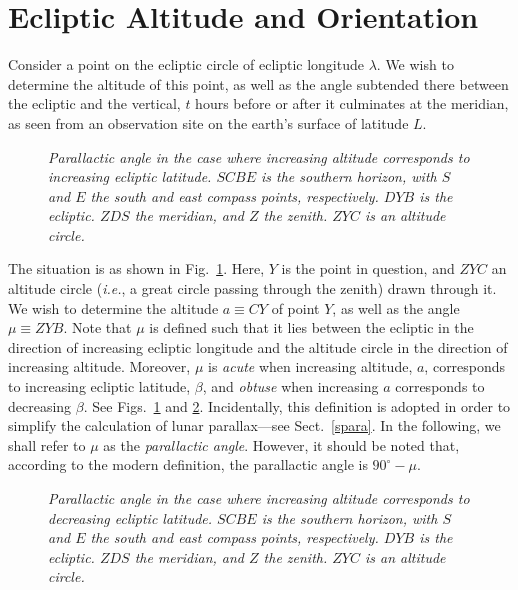 \section{Ecliptic Altitude and Orientation} 
Consider a point on the ecliptic circle of ecliptic longitude $\lambda$. We
wish to determine the altitude of this point, as well as the
angle subtended there between the ecliptic and the vertical, $t$ hours before or after it
culminates at the meridian, as seen from an observation site on the earth's surface of latitude $L$.

\begin{figure}
\epsfysize=3in
\centerline{}
\caption{\em Parallactic angle in the case where increasing altitude corresponds to increasing ecliptic latitude. $SCBE$ is the southern horizon, with $S$ and $E$ the south and east compass points, respectively. $DYB$ is
the ecliptic. $ZDS$  the meridian, and $Z$ the zenith. $ZYC$ is
an altitude circle.}\label{f11}
\end{figure}

The situation is as shown in Fig.~\ref{f11}. Here, $Y$ is the point in question, and
$ZYC$ an altitude circle ({\em i.e.}, a great circle passing through the zenith)  
 drawn through it. We wish to determine the altitude $a\equiv CY$ of point $Y$,
as well as the angle $\mu\equiv ZYB$. Note that  $\mu$ is  defined such that it lies between the ecliptic in the direction of
increasing ecliptic longitude and  the altitude circle in the direction of increasing altitude. Moreover, $\mu$
is {\em acute}\/ when increasing altitude, $a$, corresponds to increasing ecliptic latitude, $\beta$, and {\em obtuse}\/
when increasing $a$ corresponds to decreasing $\beta$. See Figs.~\ref{f11} and \ref{f12}. Incidentally, this definition is adopted in order to simplify the calculation
of lunar parallax---see Sect.~\ref{spara}.
In the following, we shall
refer to $\mu$ as the {\em parallactic angle}. However, it should be
noted that, according to the modern definition, the parallactic
angle is $90^\circ-\mu$. 

\begin{figure}
\epsfysize=3in
\centerline{}
\caption{\em Parallactic angle in the case where increasing altitude corresponds to decreasing ecliptic latitude. $SCBE$ is the southern horizon, with $S$ and $E$ the south and east compass points, respectively. $DYB$ is
the ecliptic. $ZDS$  the meridian, and $Z$ the zenith. $ZYC$ is
an altitude circle.}\label{f12}
\end{figure}


